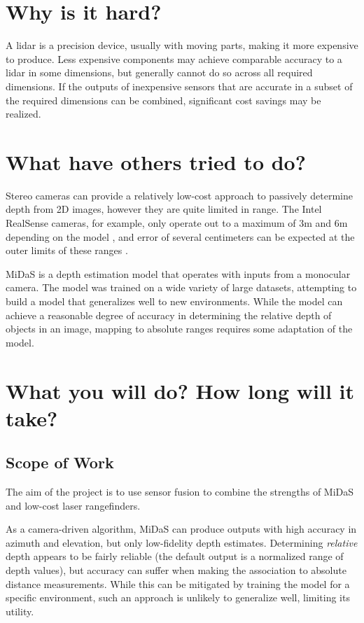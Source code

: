 \documentclass[conference]{IEEEtran}
\begin{document}
\section{Why is it hard?}
A lidar is a precision device, usually with moving parts, making it more
expensive to produce. Less expensive components may achieve comparable accuracy
to a lidar in some dimensions, but generally cannot do so across all required
dimensions. If the outputs of inexpensive sensors that are accurate in a subset
of the required dimensions can be combined, significant cost savings may be
realized.

\section{What have others tried to do?}
Stereo cameras can provide a relatively low-cost approach to passively
determine depth from 2D images, however they are quite limited in range. The
Intel RealSense cameras, for example, only operate out to a maximum of 3m and
6m depending on the model \cite{realsense-range}, and error of several
centimeters can be expected at the outer limits of these ranges
\cite{realsense-error}.

MiDaS \cite{midas} \cite{midas-paper} is a depth estimation model that operates
with inputs from a monocular camera. The model was trained on a wide variety of
large datasets, attempting to build a model that generalizes well to new
environments. While the model can achieve a reasonable degree of accuracy in
determining the relative depth of objects in an image, mapping to absolute
ranges requires some adaptation of the model.


\section{What you will do? How long will it take?}
\subsection{Scope of Work}
The aim of the project is to use sensor fusion to combine the strengths of
MiDaS and low-cost laser rangefinders.

As a camera-driven algorithm, MiDaS can produce outputs with high accuracy in
azimuth and elevation, but only low-fidelity depth estimates. Determining
\textit{relative} depth appears to be fairly reliable (the default output is a
normalized range of depth values), but accuracy can suffer when making the
association to absolute distance measurements. While this can be mitigated by
training the model for a specific environment, such an approach is unlikely to
generalize well, limiting its utility.
\end{document}
